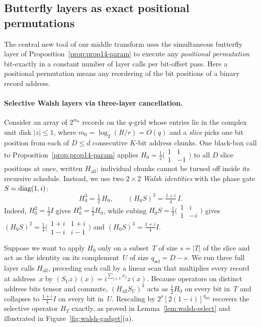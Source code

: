 \subsection{Butterfly layers as exact positional permutations}\label{sec:overview-walsh}

The central new tool of our middle transform uses the simultaneous butterfly layer of Proposition~\ref{prop:prop14-param} to execute any \emph{positional permutation} bit-exactly in a constant number of layer calls per bit-offset pass. Here a positional permutation means any reordering of the bit positions of a binary record address.

\paragraph{Selective Walsh layers via three-layer cancellation.}
Consider an array of $2^{m_0}$ records on the $q$-grid whose entries lie in the complex unit disk $|z|\le 1$, where $m_0=\log_2(R/r)=O(q)$ and a \emph{slice} picks one bit position from each of $D\le d$ consecutive $K$-bit address chunks. One black-box call to Proposition~\ref{prop:prop14-param} applies $H_0=\frac12\bigl(\begin{smallmatrix}1&1\\1&-1\end{smallmatrix}\bigr)$ to all $D$ slice positions at once, written $H_{\mathrm{all}}$; individual chunks cannot be turned off inside its recursive schedule. Instead, we use two $2\times 2$ \emph{Walsh identities} with the phase gate $S=\operatorname{diag}(1,i)$:
\begin{equation}\label{eq:overview-h3}
  H_0^3 = \tfrac12\,H_0, \qquad (H_0 S)^3 = \tfrac{1+i}{4}\,I.
\end{equation}
Indeed, $H_0^2=\frac12 I$ gives $H_0^3=\frac12 H_0$, while cubing $H_0 S = \frac12\bigl(\begin{smallmatrix}1&i\\1&-i\end{smallmatrix}\bigr)$ gives $(H_0 S)^2 = \frac14\bigl(\begin{smallmatrix}1+i & 1+i\\ 1-i & i-1\end{smallmatrix}\bigr)$ and $(H_0 S)^3 = \frac{1+i}{4}I$.

Suppose we want to apply $H_0$ only on a subset~$T$ of size $s=|T|$ of the slice and act as the identity on its complement~$U$ of size $q_{\mathrm{sel}}=D-s$. We run three full layer calls $H_{\mathrm{all}}$, preceding each call by a linear scan that multiplies every record at address~$x$ by $(S_U z)(x) = i^{\sum_{j\in U} x_j} z(x)$. Because operators on distinct address bits tensor and commute, $(H_{\mathrm{all}} S_U)^3$ acts as $\frac12 H_0$ on every bit in~$T$ and collapses to $\frac{1+i}{4}I$ on every bit in~$U$. Rescaling by $2^s[2(1-i)]^{q_{\mathrm{sel}}}$ recovers the selective operator $H_T$ exactly, as proved in Lemma~\ref{lem:walsh-select} and illustrated in Figure~\ref{fig:walsh-gadget}(a).

